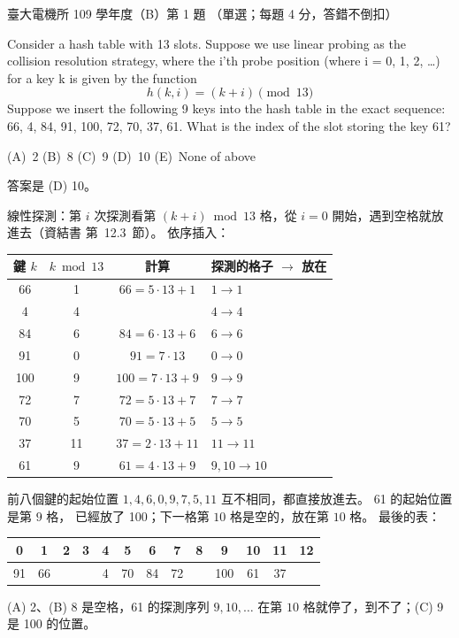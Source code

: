 \begin{pastexam}[label={px:ntu-109-ee-ds-01}]{臺大電機所 109 學年度（B）第 1 題}
（單選；每題 4 分，答錯不倒扣）

Consider a hash table with 13 slots. Suppose we use linear probing as the collision resolution
strategy, where the i'th probe position (where i = 0, 1, 2, \ldots) for a key k is given by the
function
\[ h(k,i) = (k+i) \pmod{13} \]
Suppose we insert the following 9 keys into the hash table in the exact sequence: 66, 4, 84, 91,
100, 72, 70, 37, 61. What is the index of the slot storing the key 61?

(A)~2 \qquad (B)~8 \qquad (C)~9 \qquad (D)~10 \qquad (E)~None of above
\end{pastexam}

\begin{pastsoln}
答案是 (D) 10。

線性探測：第 $i$ 次探測看第 $(k + i) \bmod 13$ 格，從 $i = 0$ 開始，遇到空格就放進去（資結書
第~12.3~節）。 依序插入：
\begin{center}
\begin{tabular}{cccl}
\toprule
鍵 $k$ & $k \bmod 13$ & 計算 & 探測的格子 $\to$ 放在 \\
\midrule
66 & 1 & $66 = 5 \cdot 13 + 1$ & $1 \to 1$ \\
4 & 4 & & $4 \to 4$ \\
84 & 6 & $84 = 6 \cdot 13 + 6$ & $6 \to 6$ \\
91 & 0 & $91 = 7 \cdot 13$ & $0 \to 0$ \\
100 & 9 & $100 = 7 \cdot 13 + 9$ & $9 \to 9$ \\
72 & 7 & $72 = 5 \cdot 13 + 7$ & $7 \to 7$ \\
70 & 5 & $70 = 5 \cdot 13 + 5$ & $5 \to 5$ \\
37 & 11 & $37 = 2 \cdot 13 + 11$ & $11 \to 11$ \\
61 & 9 & $61 = 4 \cdot 13 + 9$ & $9, 10 \to 10$ \\
\bottomrule
\end{tabular}
\end{center}
前八個鍵的起始位置 $1, 4, 6, 0, 9, 7, 5, 11$ 互不相同，都直接放進去。 61 的起始位置是第 $9$ 格，
已經放了 100；下一格第 $10$ 格是空的，放在第 $10$ 格。 最後的表：
\begin{center}
\begin{tabular}{*{13}{c}}
\toprule
0 & 1 & 2 & 3 & 4 & 5 & 6 & 7 & 8 & 9 & 10 & 11 & 12 \\
\midrule
91 & 66 & & & 4 & 70 & 84 & 72 & & 100 & 61 & 37 & \\
\bottomrule
\end{tabular}
\end{center}
(A) 2、(B) 8 是空格，61 的探測序列 $9, 10, \ldots$ 在第 $10$ 格就停了，到不了；(C) 9 是 100 的位置。
\end{pastsoln}
